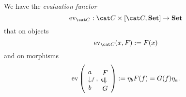 
We have the {\em evaluation functor}
\[\ev_{\cat C} : \cat C \times [\cat C, \Set] \to \Set\]
that on objects
\[\ev_{\cat C}(x, F) := F(x)\]
and on morphisms
\[\ev\left(\begin{tikzcd}[row sep=small] a \ar["f", d] \\ b \end{tikzcd}, \begin{tikzcd}[row sep=small] F \ar["\eta", d, swap, Rightarrow] \\ G \end{tikzcd}\right) := \eta_b F(f) = G(f) \eta_a .\]


